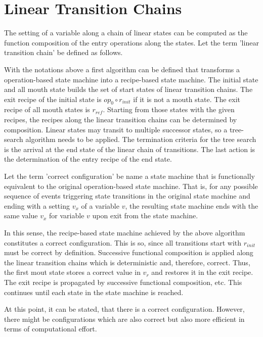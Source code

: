 \documentclass[12pt,a4paper]{scrartcl}
\begin{document}
\section{Linear Transition Chains}

The setting of a variable along a chain of linear states can be computed as the
function composition of the entry operations along the states. Let the term 'linear
transition chain' be defined as follows. 

With the notations above a first algorithm can be defined that transforms a
operation-based state machine into a recipe-based state machine. The initial
state and all mouth state builds the set of start states of linear transition
chains. The exit recipe of the initial state is $op_0\circ r_{init}$ if it is
not a mouth state. The exit recipe of all mouth states is $r_{ref}$. Starting from
those states with the given recipes, the recipes along the linear transition
chains can be determined by composition. Linear states may transit to multiple
successor states, so a tree-search algorithm needs to be applied.  The
termination criteria for the tree search is the arrival at the end state of the
linear chain of transitions.  The last action is the determination of the entry
recipe of the end state. 

Let the term 'correct configuration' be name a state machine that is
functionally equivalent to the original operation-based state machine. That is,
for any possible sequence of events triggering state transitions in the
original state machine and ending with a setting $v_x$ of a variable $v$, the
resulting state machine ends with the same value $v_x$ for variable $v$ upon
exit from the state machine. 

In this sense, the recipe-based state machine achieved by the above algorithm
constitutes a correct configuration. This is so, since all transitions start
with $r_{init}$ must be correct by definition. Successive functional composition
is applied along the linear transition chains which is deterministic and,
therefore, correct. Thus, the first mout state stores a correct value in $v_r$
and restores it in the exit recipe. The exit recipe is propagated by successive
functional composition, etc. This continues until each state in the state machine
is reached.  

At this point, it can be stated, that there is a correct configuration.
However, there might be configurations which are also correct but also more
efficient in terms of computational effort.
\end{document}
